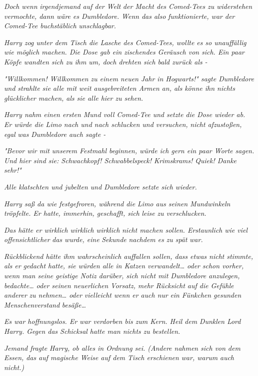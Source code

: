 {\emph{Doch wenn} \emph{\emph{irgendjemand auf der Welt}} \emph{der Macht des Comed-Tees zu widerstehen vermochte, dann wäre es Dumbledore. Wenn das also} \emph{funktionierte, war der Comed-Tee buchstäblich} \emph{\emph{unschlagbar.}}

\emph{Harry zog unter dem Tisch die Lasche des Comed-Tees, wollte es so unauffällig wie möglich machen. Die Dose gab ein zischendes Geräusch von sich. Ein paar Köpfe wandten sich zu ihm um, doch drehten sich bald zurück als -}

\emph{"Willkommen! Willkommen zu einem neuen Jahr in Hogwarts!" sagte Dumbledore und strahlte sie alle mit weit ausgebreiteten Armen an, als könne ihn nichts glücklicher machen, als sie alle hier zu sehen.}

\emph{Harry nahm einen ersten Mund voll Comed-Tee und setzte die Dose wieder ab. Er würde die Limo nach und nach schlucken und versuchen,} \emph{nicht afzustoßen, egal} \emph{\emph{was}} \emph{Dumbledore auch sagte -}

\emph{"Bevor wir mit unserem Festmahl beginnen, würde ich gern ein paar Worte sagen. Und hier sind sie: Schwachkopf! Schwabbelspeck! Krimskrams! Quiek! Danke sehr!"}

\emph{Alle klatschten und jubelten und Dumbledore setzte sich wieder.}

\emph{Harry saß da wie festgefroren, während die Limo aus seinen Mundwinkeln tröpfelte. Er hatte, immerhin, geschafft, sich} \emph{\emph{leise}} \emph{zu verschlucken.}

\emph{Das hätte er wirklich wirklich} \emph{\emph{wirklich}} \emph{nicht machen sollen. Erstaunlich wie viel} \emph{\emph{offensichtlicher}} \emph{das wurde, eine} \emph{\emph{Sekunde}} \emph{nachdem es} \emph{\emph{zu spät}} \emph{war.}

\emph{Rückblickend hätte ihm wahrscheinlich auffallen sollen, dass etwas nicht stimmte, als er gedacht hatte, sie würden alle in Katzen verwandelt… oder schon vorher, wenn man seine geistige Notiz darüber, sich nicht mit Dumbledore anzulegen, bedachte… oder seinen neuerlichen Vorsatz, mehr Rücksicht auf die Gefühle anderer} \emph{zu nehmen… oder vielleicht wenn er auch nur} \emph{\emph{ein Fünkchen gesunden Menschenverstand}} \emph{besäße…}

\emph{Es war hoffnungslos. Er war verdorben bis zum Kern. Heil dem Dunklen Lord Harry. Gegen das Schicksal} \emph{hatte man nichts zu bestellen.}

\emph{Jemand fragte Harry, ob alles in Ordnung sei. (Andere nahmen sich von dem Essen, das auf magische Weise auf dem Tisch erschienen war, warum} \emph{auch} \emph{nicht.)}

}
